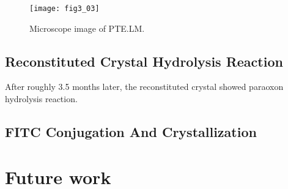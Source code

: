 \begin{refsection}
\begin{figure}[h!] \centering \texttt{[image: fig3\_03]} 
    \caption[Microscope image of PTE.LM.]{Microscope image of PTE.LM.} 
    \label{fig:ptelm-image} 
\end{figure}

\subsection{Reconstituted Crystal Hydrolysis Reaction}

After roughly 3.5 months later, the reconstituted crystal showed paraoxon
hydrolysis reaction. 

\subsection{FITC Conjugation And Crystallization}

\section{Future work}

\printbibliography[heading=subbibliography]

\end{refsection}
